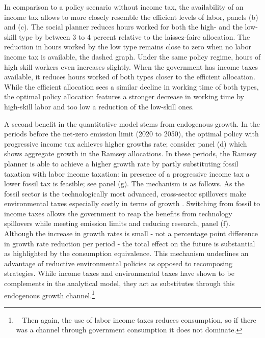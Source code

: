 %
In comparison to a policy scenario without income tax, the availability of an income tax allows to more closely resemble the efficient levels of labor, panels (b) and (c). 
The social planner reduces hours worked for both the high- and the low-skill type by between 3 to 4 percent relative to the laissez-faire allocation. The reduction in  hours worked by the low type remains close to zero when no labor income tax is available, the dashed graph. Under the same policy regime, hours of high skill workers even increases slightly. When the government has income taxes available, it reduces hours worked of both types closer to the efficient allocation. While the efficient allocation sees a similar decline in working time of both types, the optimal policy allocation features a stronger decrease in working time by high-skill labor and too low a reduction of the low-skill ones. 

A second benefit in the quantitative model stems from endogenous growth. 
In the periods before the net-zero emission limit (2020 to 2050), the optimal policy with progressive income tax achieves higher growths rate; consider panel (d) which shows aggregate growth in the Ramsey allocations. In these periods, the Ramsey planner is able to achieve a higher growth rate by partly substituting fossil taxation with labor income taxation: in presence of a progressive income tax a lower fossil tax is feasible; see panel (g). The mechanism is as follows. 
As the fossil sector is the technologically most advanced,  cross-sector spillovers make environmental taxes especially costly in terms of growth \citep[this mechanism has been discussed in][]{Fried2018ClimateAnalysis}. Switching from fossil to income taxes allows the government to reap the benefits from technology spillovers while meeting emission limits and reducing research, panel (f). Although the increase in growth rates is small - not a percentage point difference in growth rate reduction per period - the total effect on the future is substantial as highlighted by the consumption equivalence. 
 This mechanism underlines an advantage of reductive environmental policies as opposed to recomposing strategies.  While income taxes and environmental taxes have shown to be complements in the analytical model, they act as substitutes through this endogenous growth channel.\footnote{\  Then again, the use of labor income taxes reduces consumption, so if there was a channel through government consumption it does not dominate.}


